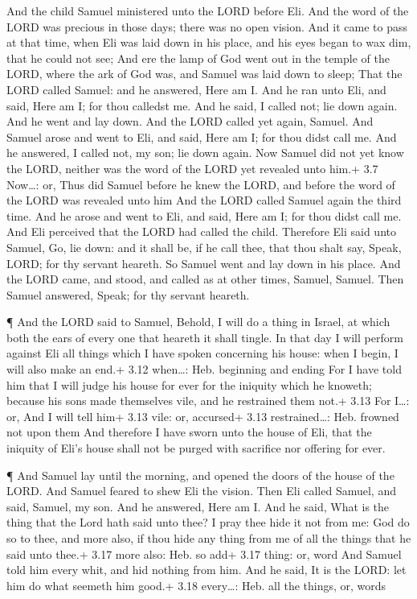  And the child Samuel ministered unto the LORD before Eli.
And the word of the LORD was precious in those days; there was no open
vision.  And it came to pass at that time, when Eli was laid
down in his place, and his eyes began to wax dim, that he could not see;
 And ere the lamp of God went out in the temple of the LORD,
where the ark of God was, and Samuel was laid down to sleep;
 That the LORD called Samuel: and he answered, Here am I.
 And he ran unto Eli, and said, Here am I; for thou calledst
me. And he said, I called not; lie down again. And he went and lay down.
 And the LORD called yet again, Samuel. And Samuel arose and
went to Eli, and said, Here am I; for thou didst call me. And he
answered, I called not, my son; lie down again.  Now Samuel
did not yet know the LORD, neither was the word of the LORD yet revealed
unto him.+ 3.7 Now\ldots: or, Thus did Samuel before he knew the LORD,
and before the word of the LORD was revealed unto him  And
the LORD called Samuel again the third time. And he arose and went to
Eli, and said, Here am I; for thou didst call me. And Eli perceived that
the LORD had called the child.  Therefore Eli said unto
Samuel, Go, lie down: and it shall be, if he call thee, that thou shalt
say, Speak, LORD; for thy servant heareth. So Samuel went and lay down
in his place.  And the LORD came, and stood, and called as
at other times, Samuel, Samuel. Then Samuel answered, Speak; for thy
servant heareth.

 ¶ And the LORD said to Samuel, Behold, I will do a thing
in Israel, at which both the ears of every one that heareth it shall
tingle.  In that day I will perform against Eli all things
which I have spoken concerning his house: when I begin, I will also make
an end.+ 3.12 when\ldots: Heb. beginning and ending  For I
have told him that I will judge his house for ever for the iniquity
which he knoweth; because his sons made themselves vile, and he
restrained them not.+ 3.13 For I\ldots: or, And I will tell him+ 3.13
vile: or, accursed+ 3.13 restrained\ldots: Heb. frowned not upon them
 And therefore I have sworn unto the house of Eli, that the
iniquity of Eli's house shall not be purged with sacrifice nor offering
for ever.

 ¶ And Samuel lay until the morning, and opened the doors
of the house of the LORD. And Samuel feared to shew Eli the vision.
 Then Eli called Samuel, and said, Samuel, my son. And he
answered, Here am I.  And he said, What is the thing that
the Lord hath said unto thee? I pray thee hide it not from me: God do so
to thee, and more also, if thou hide any thing from me of all the things
that he said unto thee.+ 3.17 more also: Heb. so add+ 3.17 thing: or,
word  And Samuel told him every whit, and hid nothing from
him. And he said, It is the LORD: let him do what seemeth him good.+
3.18 every\ldots: Heb. all the things, or, words

